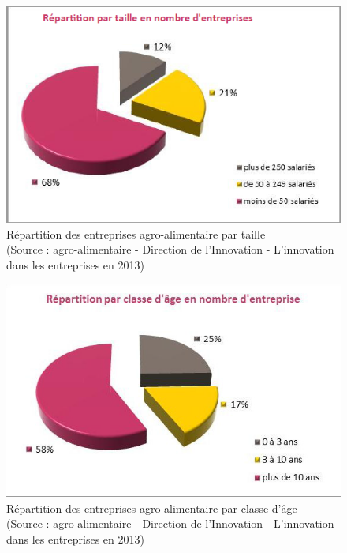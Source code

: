 \documentclass[a4paper,12pt]{report}
\begin{document}
	
	\begin{figure}[!h]
	\centering
	\includegraphics[scale=1]{Illustrations/RepartitionTaille.png}
	\caption{Répartition des entreprises agro-alimentaire par taille\\(Source : agro-alimentaire - Direction de l’Innovation - L’innovation dans les entreprises en 2013\cite{InnovationEntreprises2013})}
	\label{RepartitionParTaille}
	\end{figure}
	
	\begin{figure}[!h]
	\centering
	\includegraphics[scale=1]{Illustrations/RepartitionClasseAge.png}
	\caption{Répartition des entreprises agro-alimentaire par classe d'âge\\(Source : agro-alimentaire - Direction de l’Innovation - L’innovation dans les entreprises en 2013\cite{InnovationEntreprises2013})}
	\label{RepartitionParTaille}
	\end{figure}
\end{document}
